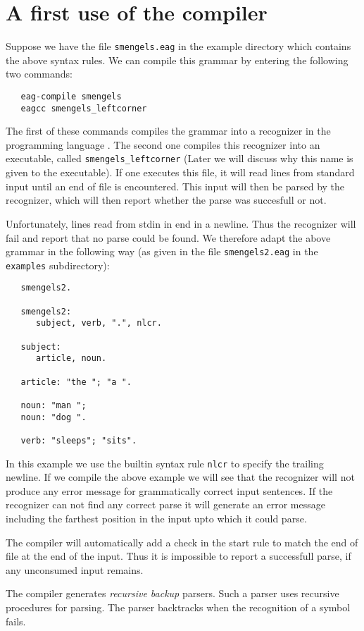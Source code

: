 \section {A first use of the compiler}
Suppose we have the file {\tt smengels.eag} in the example directory
which contains the above syntax rules. We can compile this grammar by
entering the following two commands:
\begin{verbatim}
   eag-compile smengels
   eagcc smengels_leftcorner
\end{verbatim}
The first of these commands compiles the grammar into a recognizer 
in the programming language \Cns. The second one compiles this recognizer
into an executable, called {\tt smengels\_leftcorner} (Later we will
discuss why this name is given to the executable). If one executes
this file, it will read lines from standard input until an end of file is
encountered. This input will then be parsed by the recognizer, which
will then report whether the parse was succesfull or not.

Unfortunately, lines read from stdin in \Unix end in a newline.
Thus the recognizer will fail and report that no parse could be found.
We therefore adapt the above grammar in the following way (as given
in the file {\tt smengels2.eag} in the {\tt examples} subdirectory):
\begin{verbatim}
   smengels2.

   smengels2:
      subject, verb, ".", nlcr.

   subject:
      article, noun.

   article: "the "; "a ".

   noun: "man ";
   noun: "dog ".

   verb: "sleeps"; "sits".
\end{verbatim}
In this example we use the builtin syntax rule {\tt nlcr} to
specify the trailing newline.  If we compile the above example
we will see that the recognizer will not produce any error
message for grammatically correct input sentences. If
the recognizer can not find any correct parse it will generate
an error message including the farthest position in the input upto
which it could parse.

The \EAG compiler will automatically add a check in the start rule
to match the end of file at the end of the input. Thus it is
impossible to report a successfull parse, if any unconsumed
input remains.

The \EAG compiler generates {\em recursive backup} parsers.
Such a parser uses recursive procedures for parsing. 
The parser backtracks when the recognition of a symbol
fails.

